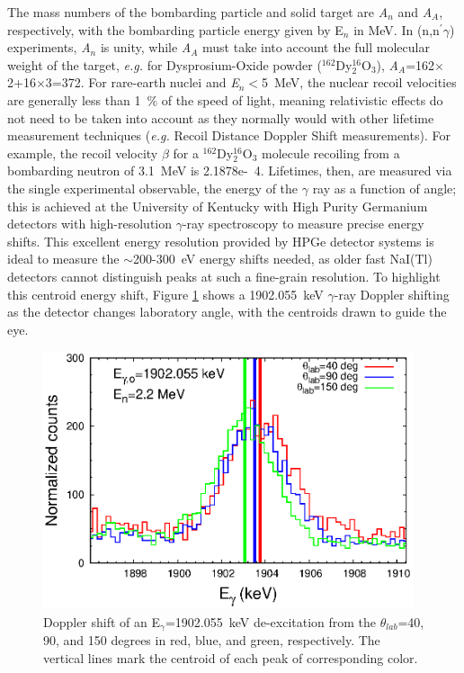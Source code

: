 The mass numbers of the bombarding particle and solid target are \textit{A$_n$} and \textit{A$_A$}, respectively, with the bombarding particle energy given by E$_n$ in MeV. In (n,n$^{\prime}\gamma$) experiments, \textit{A$_n$} is unity, while \textit{A$_A$} must take into account the full molecular weight of the target, \textit{e.g.} for Dysprosium-Oxide powder ($^{162}$Dy$_2^{16}$O$_3$), \textit{A$_A$}=162$\times$2+16$\times$3=372. For rare-earth nuclei and \textit{E$_n$}$<$5~MeV, the nuclear recoil velocities are generally less than 1~\% of the speed of light, meaning relativistic effects do not need to be taken into account as they normally would with other lifetime measurement techniques (\textit{e.g.} Recoil Distance Doppler Shift measurements). For example, the recoil velocity $\beta$ for a $^{162}$Dy$_2^{16}$O$_3$ molecule recoiling from a bombarding neutron of 3.1~MeV is 2.1878e-~4. Lifetimes, then, are measured via the single experimental observable, the energy of the $\gamma$ ray as a function of angle; this is achieved at the University of Kentucky with High Purity Germanium detectors with high-resolution $\gamma$-ray spectroscopy to measure precise energy shifts. This excellent energy resolution provided by HPGe detector systems is ideal to measure the $\sim$200-300~eV energy shifts needed, as older fast NaI(Tl) detectors cannot distinguish peaks at such a fine-grain resolution. To highlight this centroid energy shift, Figure \ref{fig:spectra_shift_DSAM} shows a 1902.055~keV $\gamma$-ray Doppler shifting as the detector changes laboratory angle, with the centroids drawn to guide the eye.

\begin{figure}[h] 
\begin{center}
\includegraphics[width=0.97\textwidth]{spectra_shift_DSAM.eps}
\caption{Doppler shift of an E$_\gamma$=1902.055~keV de-excitation from the $\theta_{lab}$=40, 90, and 150 degrees in red, blue, and green, respectively. The vertical lines mark the centroid of each peak of corresponding color.}
\label{fig:spectra_shift_DSAM}
\end{center}
\end{figure}


